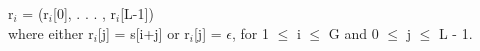 \documentclass[preview]{standalone}
\begin{document}
\begin{center}
r$_i$ = (r$_i$[0], . . . , r$_i$[L-1]) \\ where either r$_i$[j] = s[i+j] or r$_i$[j] = $\epsilon$, for 1 $\le$ i $\le$ G and 0 $\le$  j $\le$ L - 1.
\end{center}
\end{document}
